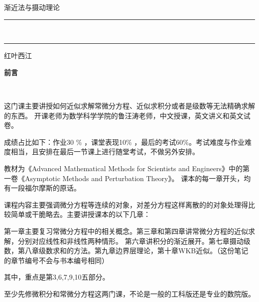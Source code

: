 \documentclass[10pt, a4paper]{book}
\begin{document}
%

\begin{titlepage}
    \vspace*{1.75\baselineskip}
    \begin{flushleft}
        \Huge{渐近法与摄动理论}\\
    \end{flushleft}
	\rule{18cm}{0.4pt}\vspace*{-\baselineskip}\vspace{3.2pt}\\ %
	\rule{18cm}{1.6pt} %
	
    \vspace{15cm} %
    \begin{flushleft}
       \large  红叶西江
    \end{flushleft}
    
        
\end{titlepage}

\setcounter{page}{1}

\begin{center}
    \Huge\textbf{前言}
\end{center}~\

这门课主要讲授如何近似求解常微分方程、近似求积分或者是级数等无法精确求解的东西。
开课老师为数学科学学院的鲁汪涛老师，中文授课，英文讲义和英文试卷。

成绩占比如下：作业30 \% ，课堂表现10\% ，最后的考试60\%。考试难度与作业难度相当，且安排在最后一节课上进行随堂考试，不做另外安排。

教材为《Advanced Mathematical Methods for Scientists and Engineers》中的第一卷《Asymptotic Methods and Perturbation Theory》。
课本的每一章开头，均有一段福尔摩斯的原话。

课程内容主要强调微分方程等连续的对象，对差分方程这样离散的的对象处理得比较简单或干脆略去。主要讲授课本的以下几章：

第一章主要复习常微分方程中的相关概念。第三章和第四章讲常微分方程的近似求解，分别对应线性和非线性两种情形。
第六章讲积分的渐近展开。第七章摄动级数，第八章级数求和的方法。第九章边界层理论，第十章WKB近似。（这份笔记的章节编号不会与书本编号相同）

其中，重点是第3,6,7,9,10五部分。

至少先修微积分和常微分方程这两门课，不论是一般的工科版还是专业的数院版。
\end{document}
